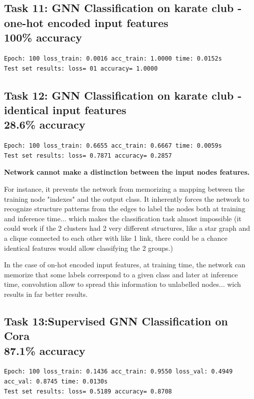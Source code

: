 \documentclass[a4paper]{article}
\begin{document}
\subsection*{Task 11: GNN Classification on karate club - one-hot encoded input features \\ 100\% accuracy}
\begin{verbatim}
Epoch: 100 loss_train: 0.0016 acc_train: 1.0000 time: 0.0152s
Test set results: loss= 01 accuracy= 1.0000
\end{verbatim}

\subsection*{Task 12: GNN Classification on karate club - identical input features \\ 28.6\% accuracy}
\begin{verbatim}
Epoch: 100 loss_train: 0.6655 acc_train: 0.6667 time: 0.0059s
Test set results: loss= 0.7871 accuracy= 0.2857
\end{verbatim}  
\textbf{Network cannot make a distinction between the input nodes features.}

For instance, it prevents the network from memorizing a mapping between the training node "indexes" and the output class.
It inherently forces the network to recognize structure patterns from the edges to label the nodes both at training and inference time...
which makes the classification task almost impossible 
(it could work if the 2 clusters had 2 very different structures, like a star graph and a clique connected to each other with like 1 link,
there could be a chance identical features would allow classifying the 2 groups.)

In the case of on-hot encoded input features, at training time, the network can memorize that some labels correspond
to a given class and later at inference time, convolution allow to spread this information to unlabelled nodes...
wich results in far better results.



\subsection*{Task 13:Supervised GNN Classification on Cora \\ 87.1\% accuracy}
\begin{verbatim}
Epoch: 100 loss_train: 0.1436 acc_train: 0.9550 loss_val: 0.4949 acc_val: 0.8745 time: 0.0130s
Test set results: loss= 0.5189 accuracy= 0.8708
\end{verbatim}
\end{document}
